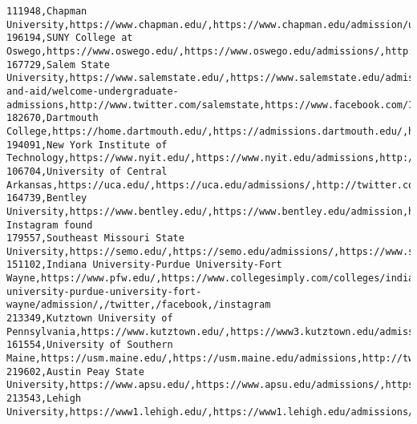 \documentclass[11pt]{article}
\begin{document}
\begin{Verbatim}[commandchars=\\\{\}]
111948,Chapman University,https://www.chapman.edu/,https://www.chapman.edu/admission/undergraduate/index.aspx,https://twitter.com/chapmanu,https://www.facebook.com/ChapmanUniversity,https://www.instagram.com/chapmanu/
196194,SUNY College at Oswego,https://www.oswego.edu/,https://www.oswego.edu/admissions/,http://www.twitter.com/sunyoswego,http://www.facebook.com/sunyoswego,http://www.instagram.com/sunyoswego
167729,Salem State University,https://www.salemstate.edu/,https://www.salemstate.edu/admissions-and-aid/welcome-undergraduate-admissions,http://www.twitter.com/salemstate,https://www.facebook.com/118242334891805,https://www.instagram.com/salemstate
182670,Dartmouth College,https://home.dartmouth.edu/,https://admissions.dartmouth.edu/,https://www.twitter.com/dartmouth,https://www.facebook.com/Dartmouth,https://www.instagram.com/dartmouthcollege/
194091,New York Institute of Technology,https://www.nyit.edu/,https://www.nyit.edu/admissions,http://www.twitter.com/nyit/,http://www.facebook.com/mynyit,https://www.instagram.com/nyit\_photos/
106704,University of Central Arkansas,https://uca.edu/,https://uca.edu/admissions/,http://twitter.com/ucabears,http://facebook.com/ucentralarkansas,http://instagram.com/ucabears
164739,Bentley University,https://www.bentley.edu/,https://www.bentley.edu/admission,http://www.twitter.com/bentleyu,http://www.facebook.com/bentleyuniversity,No Instagram found
179557,Southeast Missouri State University,https://semo.edu/,https://semo.edu/admissions/,https://www.semo.edu/twitter/,https://www.semo.edu/facebook/,https://www.semo.edu/instagram/
151102,Indiana University-Purdue University-Fort Wayne,https://www.pfw.edu/,https://www.collegesimply.com/colleges/indiana/indiana-university-purdue-university-fort-wayne/admission/,/twitter,/facebook,/instagram
213349,Kutztown University of Pennsylvania,https://www.kutztown.edu/,https://www3.kutztown.edu/admissions/good.html,http://twitter.com/KutztownU,http://www.facebook.com/KutztownU,http://instagram.com/kutztownu
161554,University of Southern Maine,https://usm.maine.edu/,https://usm.maine.edu/admissions,http://twitter.com/USouthernMaine,http://www.facebook.com/USouthernMaine,http://instagram.com/usouthernmaine/
219602,Austin Peay State University,https://www.apsu.edu/,https://www.apsu.edu/admissions/,https://twitter.com/austinpeay,https://www.facebook.com/austinpeay,https://www.instagram.com/p/BpcWm8WnWhw/
213543,Lehigh University,https://www1.lehigh.edu/,https://www1.lehigh.edu/admissions/undergrad,http://www.lehigh.edu/twitter,http://www.lehigh.edu/facebook,http://www.lehigh.edu/instagram

\end{Verbatim}
\end{document}
